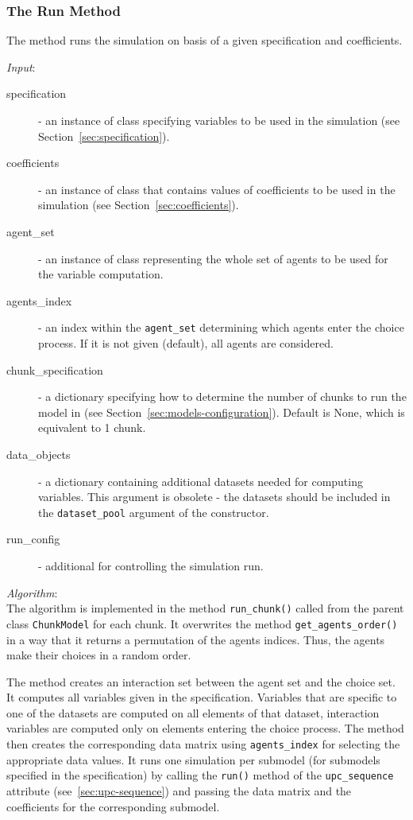 {\subsubsection{The Run Method}
%
The  method runs the simulation on basis of a given specification
and coefficients. \coefficientsindex

{\it Input}:
\begin{description}
\item[specification] - an instance of class 
  specifying variables \variablesindex to be used in the simulation (see Section~\ref{sec:specification}).
\item[coefficients] - an instance of class  \coefficientsindex that contains
  values of coefficients \coefficientsindex to be used in the simulation (see Section~\ref{sec:coefficients}).
\item[agent_set] - an instance of class  \datasetindex representing the whole
  set of agents to be used for the variable \variablesindex computation.
\item[agents_index] - an index within the \verb|agent_set| determining which
  agents enter the choice process. If it is not given (default), all agents are
  considered.
\item[chunk_specification] - a dictionary specifying how to determine the number
  of chunks to run the model in (see Section~\ref{sec:models-configuration}). 
  Default is None, which is equivalent to 1 chunk.
\item[data_objects] - a dictionary containing additional datasets \datasetindex 
  needed for computing variables. \variablesindex This argument is obsolete - the datasets should be 
  included in the \verb|dataset_pool| argument of the constructor.
\item[run_config] - additional  for controlling the
  simulation run.
\end{description}


{\it Algorithm}:~\\[1mm]
The algorithm is implemented in the method \verb|run_chunk()| called from the
parent class \verb|ChunkModel| for each chunk. It overwrites the
 method \verb|get_agents_order()| in a way that it returns a
permutation of the agents indices. Thus, the agents make their choices in a
random order.

The method creates an interaction set between the agent set and the choice
set. It computes all variables \variablesindex given in the specification. Variables \variablesindex that are
specific to one of the datasets \datasetindex are computed on all elements of that dataset, \datasetindex
interaction variables \variablesindex are computed only on elements entering the choice
process. The method then creates the corresponding data matrix using
\verb|agents_index| for selecting the appropriate data values. It runs one
simulation per submodel (for submodels specified in the specification) by
calling the \verb|run()| method of the \verb|upc_sequence| attribute \attributesindex
(see~\ref{sec:upc-sequence}) and passing the data matrix and the coefficients \coefficientsindex
for the corresponding submodel.

}
